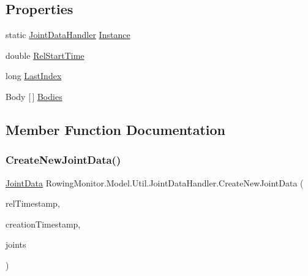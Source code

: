 \subsection*{Properties}
\begin{DoxyCompactItemize}
\item 
static \hyperlink{class_rowing_monitor_1_1_model_1_1_util_1_1_joint_data_handler}{Joint\+Data\+Handler} \hyperlink{class_rowing_monitor_1_1_model_1_1_util_1_1_joint_data_handler_a3ad8535ad9430e2a635071976a73c2ea}{Instance}
\item 
double \hyperlink{class_rowing_monitor_1_1_model_1_1_util_1_1_joint_data_handler_a6a861fd29d1f7d9e5257d2b4fd995e7d}{Rel\+Start\+Time}
\item 
long \hyperlink{class_rowing_monitor_1_1_model_1_1_util_1_1_joint_data_handler_ae5d278181fb0c1896766b4482e5a4f7e}{Last\+Index}
\item 
Body \mbox{[}$\,$\mbox{]} \hyperlink{class_rowing_monitor_1_1_model_1_1_util_1_1_joint_data_handler_a0c4ffc4145ad48004d1ffb064801adae}{Bodies}
\end{DoxyCompactItemize}


\subsection{Member Function Documentation}
\mbox{\label{class_rowing_monitor_1_1_model_1_1_util_1_1_joint_data_handler_af9945324e3ca88ac94ccc052f172f68d}} 
\subsubsection{\texorpdfstring{Create\+New\+Joint\+Data()}{CreateNewJointData()}}
{\footnotesize\ttfamily \hyperlink{struct_rowing_monitor_1_1_model_1_1_util_1_1_joint_data}{Joint\+Data} Rowing\+Monitor.\+Model.\+Util.\+Joint\+Data\+Handler.\+Create\+New\+Joint\+Data (\begin{DoxyParamCaption}\item[{double}]{rel\+Timestamp,  }\item[{double}]{creation\+Timestamp,  }\item[{I\+Read\+Only\+Dictionary$<$ Joint\+Type, Joint $>$}]{joints }\end{DoxyParamCaption})}

